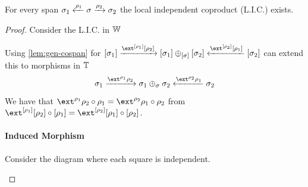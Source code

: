 \begin{lemma}\label{lem:lic-exist}
    For every span $\sigma_1 \xleftarrow{\rho_1} \sigma \xrightarrow{\rho_2} \sigma_2$ the local independent coproduct (L.I.C.) exists.
\end{lemma}
\begin{proof}
    Consider the L.I.C. in $\mathbb{W}$
    \begin{center}
    \end{center}

    Using \cref{lem:gen-cospan} for $\anyL{\sigma_1} \xto{\ext^{\anyL{\rho_1}}\anyL{\rho_2}} \anyL{\sigma_1} \liplus{\anyL\sigma} \anyL{\sigma_2} \xfrom{\ext^{\anyL{\rho_2}}\anyL{\rho_1}} \anyL{\sigma_2}$ can extend this to morphisms in $\mathbb{T}$
        \[ \sigma_1 \xto{\ext^{\rho_1}\rho_2} \sigma_1 \liplus\sigma \sigma_2 \xfrom{\ext^{\rho_2}\rho_1} \sigma_2 \]
        We have that $\ext^{\rho_1}\rho_2 \comp \rho_1 = \ext^{\rho_2}\rho_1 \comp \rho_2$ from $\ext^{\anyL{\rho_1}}\anyL{\rho_2} \comp \anyL{\rho_1} = \ext^{\anyL{\rho_2}}\anyL{\rho_1} \comp \anyL{\rho_2}$.

    \paragraph{Induced Morphism}
    Consider the diagram where each square is independent.
    \begin{center}
    \end{center}


\end{proof}
